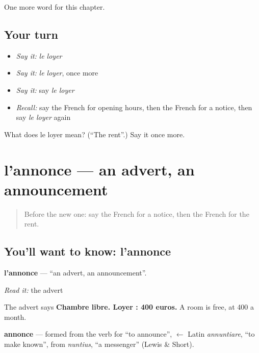 \begin{grammarlens}[title={What you've built}]
One more word for this chapter.
\end{grammarlens}

\subsection*{Your turn}
\begin{itemize}
\raggedright
  \item \emph{Say it:} \emph{le loyer}
  \item \emph{Say it:} \emph{le loyer}, once more
  \item \emph{Say it:} say \emph{le loyer}
  \item \emph{Recall:} say the French for opening hours, then the French for a notice, then say \emph{le loyer} again
\end{itemize}

\begin{tcolorbox}[breakable,colback=teal!4,colframe=teal!35!black,title={Before you move on}]
What does le loyer mean? (\textquotedblleft{}The rent\textquotedblright{}.) Say it once more.
\end{tcolorbox}
\section[l'annonce]{l'annonce — an advert, an announcement}

\label{lesson:FR-C142-lannonce}



\begin{quote}
Before the new one: say the French for a notice, then the French for the rent.
\end{quote}

\subsection*{You'll want to know: l'annonce}
\textbf{l'annonce} — \textquotedblleft{}an advert, an announcement\textquotedblright{}.

\emph{Read it:} the advert

The advert says \textbf{Chambre libre. Loyer : 400 euros.} A room is free, at 400 a month.

\begin{cousinweb}
\textbf{annonce} — formed from the verb for \textquotedblleft{}to announce\textquotedblright{}, $\leftarrow$ Latin \emph{annuntiare}, \textquotedblleft{}to make known\textquotedblright{}, from \emph{nuntius}, \textquotedblleft{}a messenger\textquotedblright{} (Lewis \& Short).
\end{cousinweb}

